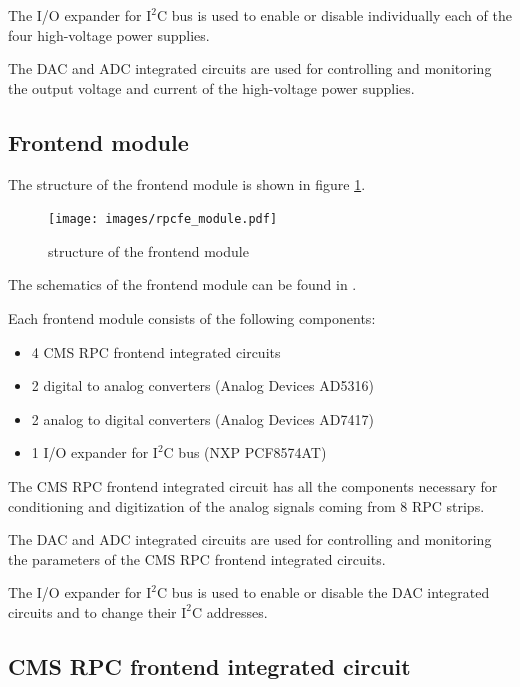 \documentclass[12pt, a4paper]{article}
\begin{document}
The I/O expander for $\text{I}^\text{2}\text{C}$ bus is used to enable or disable individually each of the four high-voltage power supplies.

The DAC and ADC integrated circuits are used for controlling and monitoring the output voltage and current of the high-voltage power supplies.

\subsection{Frontend module}

The structure of the frontend module is shown in figure \ref{fig:rpcfe_module}.

\begin{figure}[h!]
  \centering
  \texttt{[image: images/rpcfe\_module.pdf]}
  \caption{structure of the frontend module}
  \label{fig:rpcfe_module}
\end{figure}

The schematics of the frontend module can be found in \cite{rpcfesch}.

Each frontend module consists of the following components:
\begin{itemize}[nosep]
  \item 4 CMS RPC frontend integrated circuits \cite{rpcnim2000}
  \item 2 digital to analog converters (Analog Devices AD5316) \cite{ad5316}
  \item 2 analog to digital converters (Analog Devices AD7417) \cite{ad7417}
  \item 1 I/O expander for $\text{I}^\text{2}\text{C}$ bus (NXP PCF8574AT) \cite{pcf8574t}
\end{itemize}

The CMS RPC frontend integrated circuit has all the components necessary for conditioning and digitization of the analog signals coming from 8 RPC strips.

The DAC and ADC integrated circuits are used for controlling and monitoring the parameters of the CMS RPC frontend integrated circuits.

The I/O expander for $\text{I}^\text{2}\text{C}$ bus is used to enable or disable the DAC integrated circuits and to change their $\text{I}^\text{2}\text{C}$ addresses.

\subsection{CMS RPC frontend integrated circuit}
\end{document}
